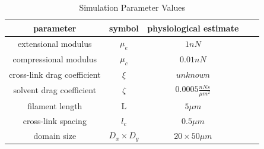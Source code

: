 \begin{table}[h]
\centering
\caption{Simulation Parameter Values}
\label{table:para}
\begin{tabular}{|c|c|c|c|c|}
\hline
{\bf parameter}             & {\bf symbol} & {\bf physiological estimate}          \\ \hline
extensional modulus         & $\mu_e$        & $1 nN $                                               \\
compressional modulus             & $\mu_c$     & $ 0.01 nN $                           \\
cross-link drag coefficient & $\xi$      & $unknown $              \\
solvent drag coefficient     & $\zeta$        & $0.0005 \frac{nN s}{\mu m^2} $      \\
filament length             & L            & $5 \mu m$                                          \\
cross-link spacing          & $l_c$        & $0.5 \mu m$                                         \\
domain size                 & $D_x\times D_y$            & $20\times 50 \mu m$                                 \\ \hline
\end{tabular}
\end{table}




